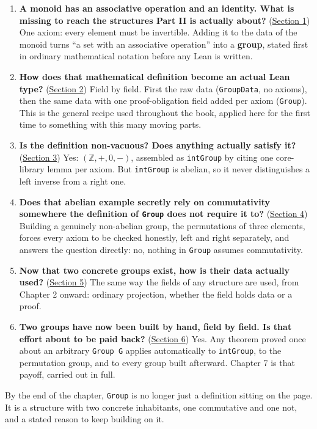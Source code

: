 \begin{enumerate}
\def\labelenumi{\arabic{enumi}.}
\tightlist
\item
  \textbf{A monoid has an associative operation and an identity. What is missing to reach the structures Part II is actually about?} (\hyperref[sec:06-groups:01-definition:1]{Section 1}) One axiom: every element must be invertible. Adding it to the data of the monoid turns ``a set with an associative operation'' into a \textbf{group}, stated first in ordinary mathematical notation before any Lean is written.
\item
  \textbf{How does that mathematical definition become an actual Lean type?} (\hyperref[sec:06-groups:02-translating:1]{Section 2}) Field by field. First the raw data (\texttt{GroupData}, no axioms), then the same data with one proof-obligation field added per axiom (\texttt{Group}). This is the general recipe used throughout the book, applied here for the first time to something with this many moving parts.
\item
  \textbf{Is the definition non-vacuous? Does anything actually satisfy it?} (\hyperref[sec:06-groups:03-integers-example:1]{Section 3}) Yes: \((\mathbb{Z}, +, 0, -)\), assembled as \texttt{intGroup} by citing one core-library lemma per axiom. But \texttt{intGroup} is abelian, so it never distinguishes a left inverse from a right one.
\item
  \textbf{Does that abelian example secretly rely on commutativity somewhere the definition of \texttt{Group} does not require it to?} (\hyperref[sec:06-groups:04-permutations-example:1]{Section 4}) Building a genuinely non-abelian group, the permutations of three elements, forces every axiom to be checked honestly, left and right separately, and answers the question directly: no, nothing in \texttt{Group} assumes commutativity.
\item
  \textbf{Now that two concrete groups exist, how is their data actually used?} (\hyperref[sec:06-groups:05-accessing-fields:1]{Section 5}) The same way the fields of any structure are used, from Chapter 2 onward: ordinary projection, whether the field holds data or a proof.
\item
  \textbf{Two groups have now been built by hand, field by field. Is that effort about to be paid back?} (\hyperref[sec:06-groups:06-why-bundle:1]{Section 6}) Yes. Any theorem proved once about an arbitrary \texttt{Group G} applies automatically to \texttt{intGroup}, to the permutation group, and to every group built afterward. Chapter 7 is that payoff, carried out in full.
\end{enumerate}

By the end of the chapter, \texttt{Group} is no longer just a definition sitting on the page. It is a structure with two concrete inhabitants, one commutative and one not, and a stated reason to keep building on it.









